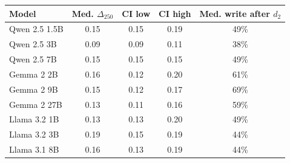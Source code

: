 \begin{tabular}{@{}lcccc@{}}
\toprule
Model & Med. $\Delta_{250}$ & CI low & CI high & Med. write after $d_2$ \\
\midrule
Qwen 2.5 1.5B & 0.15 & 0.15 & 0.19 & 49\% \\
Qwen 2.5 3B & 0.09 & 0.09 & 0.11 & 38\% \\
Qwen 2.5 7B & 0.15 & 0.15 & 0.15 & 49\% \\
Gemma 2 2B & 0.16 & 0.12 & 0.20 & 61\% \\
Gemma 2 9B & 0.15 & 0.12 & 0.17 & 69\% \\
Gemma 2 27B & 0.13 & 0.11 & 0.16 & 59\% \\
Llama 3.2 1B & 0.13 & 0.13 & 0.20 & 49\% \\
Llama 3.2 3B & 0.19 & 0.15 & 0.19 & 44\% \\
Llama 3.1 8B & 0.16 & 0.13 & 0.19 & 44\% \\
\bottomrule
\end{tabular}
